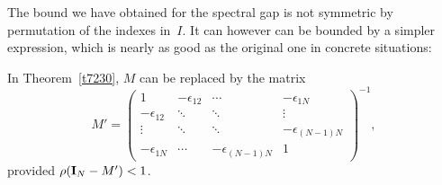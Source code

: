 The bound we have obtained for the spectral gap
is not symmetric by permutation of the indexes in~$I$.
It can however can be bounded by a simpler expression,
which is nearly as good as the original one in concrete situations:
%
\begin{Cor}
In Theorem~\ref{t7230}, $M$ can be replaced by the matrix
\[ M' = \begin{pmatrix} 1 & -\epsilon_{12} & \cdots & -\epsilon_{1N} \\
-\epsilon_{12} & \ddots & \ddots & \vdots \\
\vdots & \ddots & \ddots & -\epsilon_{(N-1)N} \\
-\epsilon_{1N} & \cdots & -\epsilon_{(N-1)N} & 1 \end{pmatrix}^{-1} ,\]
provided $\rho(\mathbf{I}_N-M') < 1$.
\end{Cor}

